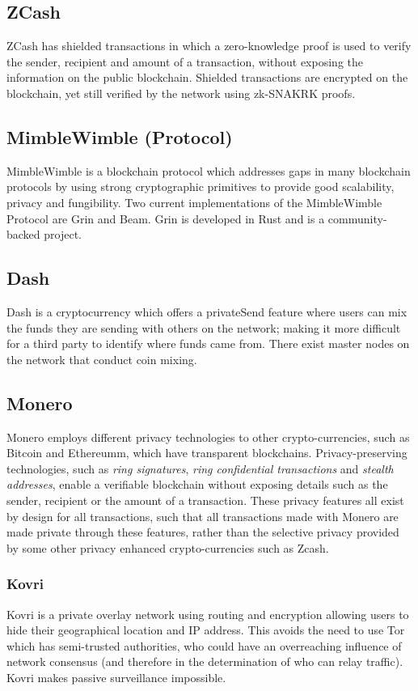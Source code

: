 \subsection{ZCash}\label{background-zcash}
ZCash has shielded transactions in which a zero-knowledge proof is used to verify the sender, recipient and amount of a transaction, without exposing the information on the public blockchain. Shielded transactions are encrypted on the blockchain, yet still verified by the network using zk-SNAKRK proofs. 

\subsection{MimbleWimble (Protocol)}\label{background-mimblewimble}
MimbleWimble is a blockchain protocol which addresses gaps in many blockchain protocols by using strong cryptographic primitives to provide good scalability, privacy and fungibility. Two current implementations of the MimbleWimble Protocol are Grin and Beam. Grin is developed in Rust and is a community-backed project. 

\subsection{Dash}
Dash is a cryptocurrency which offers a privateSend feature where users can mix the funds they are sending with others on the network; making it more difficult for a third party to identify where funds came from. There exist master nodes on the network that conduct coin mixing. 

\subsection{Monero}\label{background-monero}
Monero employs different privacy technologies to other crypto-currencies, such as Bitcoin and Ethereumm, which have transparent blockchains. Privacy-preserving technologies, such as \textit{ring signatures},\textit{ ring confidential transactions} and \textit{stealth addresses}, enable a verifiable blockchain without exposing details such as the sender, recipient or the amount of a transaction. These privacy features all exist by design for all transactions, such that all transactions made with Monero are made private through these features, rather than the selective privacy provided by some other privacy enhanced crypto-currencies such as Zcash. 

\subsubsection{Kovri}
Kovri is a private overlay network using routing and encryption allowing users to hide their geographical location and IP address. This avoids the need to use Tor which has semi-trusted authorities, who could have an overreaching influence of network consensus (and therefore in the determination of who can relay traffic). Kovri makes passive surveillance impossible. 

